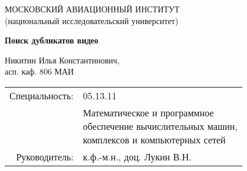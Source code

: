 
\begin{frame}
    \SansRoundedC

    \begin{center}
        \begin{center}
            \scriptsize 
            \textcolor{zblue!50!white}{
                МОСКОВСКИЙ АВИАЦИОННЫЙ ИНСТИТУТ \\
                (национальный исследовательский университет)
            } 
        \end{center}
        \vspace{2em}
        \begin{center}
            \huge
            \bfseries
            \textcolor{swhite}{
                Поиск дубликатов видео
            }
        \end{center}
        \vspace{2em}
        \parbox{19em}{
            \begin{center}
                \small
                \textcolor{swhite!60!black!50}{
                    Никитин Илья Константинович,\\
                    асп. каф. 806 МАИ
                }
            \end{center}
            {
                \scriptsize
                \renewcommand{\arraystretch}{2}%
                \begin{tabular}{rl}
                    \hspace{0.3em}
                    \textcolor{zdarkgreen!60!black!40}{
                        Специальность:
                    } 
                    &
                    \textcolor{zlightgreen!60!black!50}{
                        05.13.11
                    } 
                    \\
                    &
                    \parbox{19em}{
                        \scriptsize
                        \textcolor{zlightgreen!60!black!50}{
                            Математическое и программное \\
                            обеспечение вычислительных машин,\\ 
                            комплексов и компьютерных сетей
                        }
                    }
                    \\
                    \quad 
                    \textcolor{zdarkgreen!60!black!40}{
                        Руководитель:
                    } &
                    \textcolor{swhite!60!black!50}{
                        к.ф.-м.н., доц. Лукин В.Н.
                    }\\

                \end{tabular}
            }

        }
             
    \end{center}
\end{frame}

